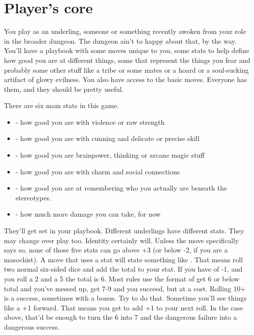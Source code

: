\documentclass{tufte-book}
\begin{document}
\chapter{Player's core}

You play as an underling, someone or something recently awoken from your role in the broader dungeon. The dungeon ain't to happy about that, by the way. You'll have a playbook with some moves unique to you, some stats to help define how good you are at different things, some  that represent the things you fear and probably some other stuff like a tribe or some mates or a hoard or a soul-sucking artifact of glowy evilness. You also have access to the basic moves. Everyone has them, and they should be pretty useful.


There are six main stats in this game.
\begin{itemize}
\item {} - how good you are with violence or raw strength
\item {} - how good you are with cunning and delicate or precise skill
\item {} - how good you are brainpower, thinking or arcane magic stuff
\item {} - how good you are with charm and social connections
\item {} - how good you are at remembering who you actually are beneath the stereotypes.
\item {} - how much more damage you can take, for now
\end{itemize}

They'll get set in your playbook. Different underlings have different stats. They may change over play too. Identity certainly will. Unless the move specifically says so, none of those five stats can go above +3 (or below -2, if you are a masochist). A move that uses a stat will state something like . That means roll two  normal six-sided dice and add the total to your stat. If you have  of -1, and you roll a 2 and a 5 the total is 6. Most rules use the format of get 6 or below total and you've messed up, get 7-9 and you succeed, but at a cost. Rolling 10+ is a success, sometimes with a bonus. Try to do that.
Sometime you'll see things like a +1 forward. That means you get to add +1 to your next roll. In the case above, that'd be enough to turn the 6 into 7 and the dangerous failure into a dangerous success.
\end{document}
